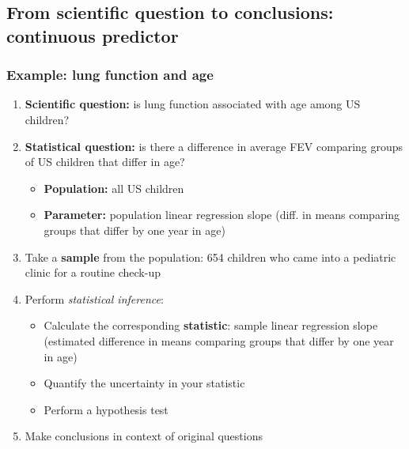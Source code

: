 \documentclass[12pt, 
hyperref={colorlinks=true, linkcolor=blue, urlcolor=cyan},dvipsnames]{beamer}
\begin{document}
\subsection{From scientific question to conclusions: continuous predictor}
\begin{frame}
\frametitle{Example: lung function and age}

\begin{enumerate}
\item \textbf{Scientific question:} is \color{blue} lung function \color{orange} associated \color{black} with age among US children? \pause
\item \textbf{Statistical question:} is there a \color{orange} difference in average \color{blue} FEV \color{black} comparing groups of US children that differ in age? \pause
	\begin{itemize}
	\item \textbf{Population:} all US children
	\item \textbf{Parameter:} population linear regression slope (diff. in means comparing groups that differ by one year in age) \pause
	\end{itemize}
\item Take a \textbf{sample} from the population: 654 children who came into a pediatric clinic for a routine check-up \pause
\item Perform \textit{statistical inference}:
	\begin{itemize}
	\item Calculate the corresponding \textbf{statistic}: sample linear regression slope (estimated difference in means comparing groups that differ by one year in age) \pause
	\item Quantify the uncertainty in your statistic
	\item Perform a hypothesis test \pause
	\end{itemize}
\item Make conclusions in context of original questions
\end{enumerate}

\end{frame}
\end{document}
